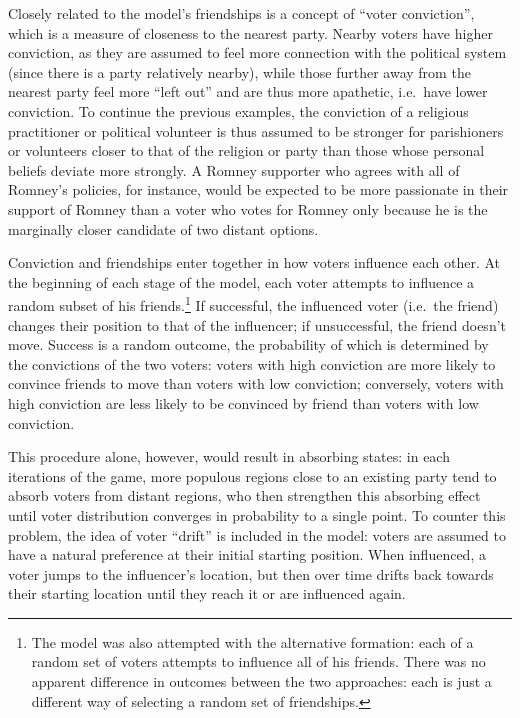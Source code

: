 \documentclass[12pt]{article}
\numberwithin{equation}{subsection}
\begin{document}
Closely related to the model's friendships is a concept of ``voter conviction'', which is a measure
of closeness to the nearest party.  Nearby voters have higher conviction, as they are assumed to
feel more connection with the political system (since there is a party relatively nearby), while
those further away from the nearest party feel more ``left out'' and are thus more apathetic, i.e.\
have lower conviction.  To continue the previous examples, the conviction of a religious
practitioner or political volunteer is thus assumed to be stronger for parishioners or volunteers
closer to that of the religion or party than those whose personal beliefs deviate more strongly.  A
Romney supporter who agrees with all of Romney's policies, for instance, would be expected to be
more passionate in their support of Romney than a voter who votes for Romney only because he is the
marginally closer candidate of two distant options.

Conviction and friendships enter together in how voters influence each other.  At the beginning of
each stage of the model, each voter attempts to influence a random subset of his friends.\footnote{
    The model was also attempted with the alternative formation: each of a random set of voters
    attempts to influence all of his friends.  There was no apparent difference in outcomes between
    the two approaches: each is just a different way of selecting a random set of friendships.
}  If successful, the influenced voter (i.e.\ the friend) changes their position to that of the
influencer; if unsuccessful, the friend doesn't move.  Success is a random outcome, the probability
of which is determined by the convictions of the two voters: voters with high conviction are more
likely to convince friends to move than voters with low conviction; conversely, voters with high
conviction are less likely to be convinced by friend than voters with low conviction.

This procedure alone, however, would result in absorbing states: in each iterations of the game,
more populous regions close to an existing party tend to absorb voters from distant regions, who
then strengthen this absorbing effect until voter distribution converges in probability to a single
point.  To counter this problem, the idea of voter ``drift'' is included in the model: voters are
assumed to have a natural preference at their initial starting position.  When influenced, a voter
jumps to the influencer's location, but then over time drifts back towards their starting location
until they reach it or are
influenced again.
\end{document}
